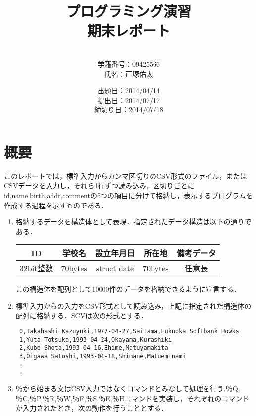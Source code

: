 \documentclass[a4j]{jarticle}
\title{プログラミング演習\\期末レポート}
\author{\\学籍番号：09425566\\氏名：戸塚佑太}
\date{出題日：2014/04/14\\提出日：2014/07/17\\締切り日：2014/07/18\\}
\begin{document}
\maketitle

\newpage



%
%

\section{概要}

このレポートでは，標準入力からカンマ区切りのCSV形式のファイル，またはCSVデータを入力し，それら1行ずつ読み込み，区切りごとにid,name,birth,addr,commentの5つの項目に分けて格納し，表示するプログラムを作成する過程を示すものである．

\begin{enumerate}
\item 格納するデータを構造体として表現．指定されたデータ構造は以下の通りである．

\begin{center}
\begin{tabular}{|c|c|c|c|c|}\hline
\centering
ID&学校名&設立年月日&所在地&備考データ\\\hline
32bit整数&70bytes&struct date&70bytes&任意長\\\hline
\end{tabular}
\end{center}

この構造体を配列として10000件のデータを格納できるように宣言する．

\item 標準入力からの入力をCSV形式として読み込み，上記に指定された構造体の配列に格納する．SCVは次の形式とする．

{\baselineskip 3mm
\begin{verbatim}
 0,Takahashi Kazuyuki,1977-04-27,Saitama,Fukuoka Softbank Howks
 1,Yuta Totsuka,1993-04-24,Okayama,Kurashiki
 2,Kubo Shota,1993-04-16,Ehime,Matuyamakita
 3,Oigawa Satoshi,1993-04-18,Shimane,Matueminami
 .
 .
\end{verbatim}
}

\item ％から始まる文はCSV入力ではなくコマンドとみなして処理を行う.％Q,％C,％P,％R,％W,％F,％S,％E,％Hコマンドを実装し，それぞれのコマンドが入力されたとき，次の動作を行うこととする．


\end{enumerate}
\end{document}
